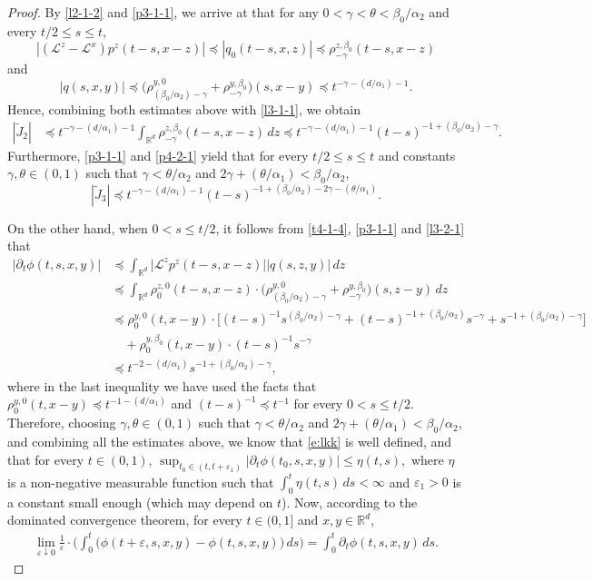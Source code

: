 \documentclass[a4paper,11pt]{amsart}
\renewcommand{\le}{\leqslant}
\newcommand{\R}{\mathds R}
\newcommand{\B}{\beta}
\newcommand{\T}{\theta}
\newcommand{\p}{\preceq}
\newcommand{\A}{\alpha}
\newcommand{\G}{\gamma}
\newcommand{\e}{ \varepsilon}
\def\LL{{\mathcal L}}
\theoremstyle{definition}
\begin{document}
\begin{proof}
By \eqref{l2-1-2} and \eqref{p3-1-1}, we arrive at that for any $0<\G<\T<{\B_0}/{\A_2}$ and every
${t}/{2}\le s \le t$,
\begin{equation*}
|( \LL^z- \LL^x)p^z(t-s,x-z)|\p
|q_0(t-s,x, z)|\p \rho^{z,\B_0}_{-\G}(t-s,x-z)
\end{equation*} and \begin{equation*}
|q(s,x,y)|\p \big(\rho^{y,0}_{({\B_0}/{\A_2})-\G}+\rho^{y,\B_0}_{-\G}\big)(s,x-y)\p t^{-\G-({d}/{\A_1})-1}.
\end{equation*}
Hence, combining both estimates above with \eqref{l3-1-1},  we obtain
\begin{align*}
|\tilde J_{2}|&\p t^{-\G-({d}/{\A_1})-1}\int_{\R^d} \rho^{z,\B_0}_{-\G}(t-s,x-z)\,dz
 \p t^{-\G-({d}/{\A_1})-1}(t-s)^{-1+({\B_0}/{\A_2})-\G}.
\end{align*}
Furthermore, \eqref{p3-1-1} and \eqref{p4-2-1} yield that for every ${t}/{2}\le s \le t$ and
constants $\gamma,\theta \in (0,1)$ such that $\gamma<{\theta}/{\A_2}$ and
$2\gamma+({\theta}/{\A_1})<\B_0/\A_2$,
\begin{equation*}
|\tilde J_3| \p t^{-\G-({d}/{\A_1})-1}(t-s)^{-1+({\B_0}/{\A_2})-2\G-({\theta}/{\A_1})}.
\end{equation*}


On the other hand, when $0<s\le {t}/{2}$,  it follows from \eqref{t4-1-4}, \eqref{p3-1-1} and \eqref{l3-2-1} that
\begin{align*}
\big|\partial_t \phi(t,s,x,y)\big|
 &\p
\int_{\R^d}\big| \LL^z p^z(t-s,x-z)\big|\big|q(s,z,y)\big|\,dz\\
&\p \int_{\R^d} \rho^{z,0}_0(t-s,x-z)\cdot
\big(\rho^{y,0}_{({\B_0}/{\A_2})-\G}+\rho^{y,\B_0}_{-\G}\big)(s,z-y)\,dz\\
&\p \rho^{y,0}_0(t,x-y)\cdot\big[(t-s)^{-1}s^{({\B_0}/{\A_2})-\G}+
(t-s)^{-1+({\B_0}/{\A_2})}s^{-\G}+s^{-1+({\B_0}/{\A_2})-\G}\big]\\
&\quad +\rho^{y,\B_0}_{0}(t,x-y)\cdot(t-s)^{-1}s^{-\G}\\
&\p t^{-2-({d}/{\A_1})}s^{-1+({\B_0}/{\A_2})-\G},
\end{align*}
where in the last inequality we have used the facts that $\rho^{y,0}_0(t,x-y)\p t^{-1-({d}/{\A_1})}$ and $(t-s)^{-1}\p t^{-1}$ for every
$0<s\le {t}/{2}$.
Therefore, choosing $\gamma,\theta \in (0,1)$ such that $\gamma<{\theta}/{\A_2}$ and
$2\gamma+({\theta}/{\A_1})<\B_0/\A_2$, and combining all the estimates above,  we
know that \eqref{e:lkk} is well defined, and that for every $t \in (0,1)$,
$
\sup_{t_0 \in (t,t+\e_1)}|
\partial_t\phi(t_0,s,x,y)|\le \eta(t,s),
$
where $\eta$ is a non-negative measurable function such that
$\int_0^t \eta(t,s)\,ds<\infty$ and $\e_1>0$ is a constant small enough (which may depend on $t$).
Now, according to the dominated convergence theorem, for every $t \in (0,1]$ and $x,y\in \R^d$,
\begin{equation}\label{t4-1-5}
\begin{split}
\lim_{\e \downarrow 0}\frac{1}{\e}\cdot
\bigg(\int_0^t \big(\phi(t+\e,s,x,y)-\phi(t,s,x,y)\big)\,ds\bigg)=
\int_0^t \partial_t \phi(t,s,x,y)\,ds.
\end{split}
\end{equation}


\end{proof}
\end{document}
